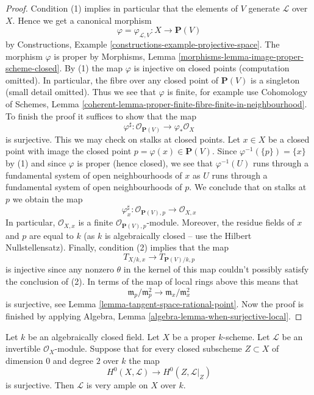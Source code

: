 \begin{proof}
Condition (1) implies in particular that the elements of $V$ generate
$\mathcal{L}$ over $X$. Hence we get a canonical morphism
$$
\varphi = \varphi_{\mathcal{L}, V} :
X
\longrightarrow
\mathbf{P}(V)
$$
by Constructions, Example \ref{constructions-example-projective-space}.
The morphism $\varphi$ is proper by
Morphisms, Lemma \ref{morphisms-lemma-image-proper-scheme-closed}.
By (1) the map $\varphi$ is injective on closed points
(computation omitted).
In particular, the fibre over any closed point of $\mathbf{P}(V)$
is a singleton (small detail omitted). Thus we see that
$\varphi$ is finite, for example use Cohomology of Schemes, Lemma
\ref{coherent-lemma-proper-finite-fibre-finite-in-neighbourhood}.
To finish the proof it suffices to show that the map
$$
\varphi^\sharp :
\mathcal{O}_{\mathbf{P}(V)}
\longrightarrow
\varphi_*\mathcal{O}_X
$$
is surjective. This we may check on stalks at closed points.
Let $x \in X$ be a closed point with image the closed
point $p = \varphi(x) \in \mathbf{P}(V)$. Since
$\varphi^{-1}(\{p\}) = \{x\}$ by (1) and since $\varphi$
is proper (hence closed), we see that $\varphi^{-1}(U)$
runs through a fundamental system of open neighbourhoods
of $x$ as $U$ runs through a fundamental system of open neighbourhoods of $p$.
We conclude that on stalks at $p$ we obtain the map
$$
\varphi^\sharp_x :
\mathcal{O}_{\mathbf{P}(V), p}
\longrightarrow
\mathcal{O}_{X, x}
$$
In particular, $\mathcal{O}_{X, x}$ is a finite
$\mathcal{O}_{\mathbf{P}(V), p}$-module.
Moreover, the residue fields of $x$ and $p$ are equal to $k$
(as $k$ is algebraically closed -- use the Hilbert Nullstellensatz).
Finally, condition (2) implies that the map
$$
T_{X/k, x} \longrightarrow T_{\mathbf{P}(V)/k, p}
$$
is injective since any nonzero $\theta$ in the kernel of this map
couldn't possibly satisfy the conclusion of (2).
In terms of the map of local rings above this means that
$$
\mathfrak m_p/\mathfrak m_p^2 \longrightarrow
\mathfrak m_x/\mathfrak m_x^2
$$
is surjective, see Lemma \ref{lemma-tangent-space-rational-point}.
Now the proof is finished by applying
Algebra, Lemma \ref{algebra-lemma-when-surjective-local}.
\end{proof}

\begin{lemma}
\label{lemma-variant-separate-points-tangent-vectors}
Let $k$ be an algebraically closed field.
Let $X$ be a proper $k$-scheme.
Let $\mathcal{L}$ be an invertible $\mathcal{O}_X$-module.
Suppose that for every closed subscheme $Z \subset X$
of dimension $0$ and degree $2$ over $k$ the map
$$
H^0(X, \mathcal{L}) \longrightarrow H^0(Z, \mathcal{L}|_Z)
$$
is surjective. Then $\mathcal{L}$ is very ample on $X$ over $k$.
\end{lemma}


